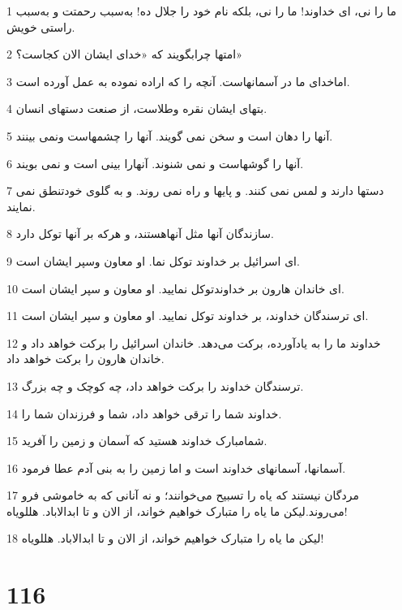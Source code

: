 \par 1 ما را نی، ای خداوند! ما را نی، بلکه نام خود را جلال ده! به‌سبب رحمتت و به‌سبب راستی خویش.
\par 2 امتها چرابگویند که «خدای ایشان الان کجاست؟»
\par 3 اماخدای ما در آسمانهاست. آنچه را که اراده نموده به عمل آورده است.
\par 4 بتهای ایشان نقره وطلاست، از صنعت دستهای انسان.
\par 5 آنها را دهان است و سخن نمی گویند. آنها را چشمهاست ونمی بینند.
\par 6 آنها را گوشهاست و نمی شنوند. آنهارا بینی است و نمی بویند.
\par 7 دستها دارند و لمس نمی کنند. و پایها و راه نمی روند. و به گلوی خودتنطق نمی نمایند.
\par 8 سازندگان آنها مثل آنهاهستند، و هر‌که بر آنها توکل دارد.
\par 9 ‌ای اسرائیل بر خداوند توکل نما. او معاون وسپر ایشان است.
\par 10 ‌ای خاندان هارون بر خداوندتوکل نمایید. او معاون و سپر ایشان است.
\par 11 ‌ای ترسندگان خداوند، بر خداوند توکل نمایید. او معاون و سپر ایشان است.
\par 12 خداوند ما را به یادآورده، برکت می‌دهد. خاندان اسرائیل را برکت خواهد داد و خاندان هارون را برکت خواهد داد.
\par 13 ترسندگان خداوند را برکت خواهد داد، چه کوچک و چه بزرگ.
\par 14 خداوند شما را ترقی خواهد داد، شما و فرزندان شما را.
\par 15 شمامبارک خداوند هستید که آسمان و زمین را آفرید.
\par 16 آسمانها، آسمانهای خداوند است و اما زمین را به بنی آدم عطا فرمود.
\par 17 مردگان نیستند که یاه را تسبیح می‌خوانند؛ و نه آنانی که به خاموشی فرو می‌روند.لیکن ما یاه را متبارک خواهیم خواند، از الان و تا ابدالاباد. هللویاه!
\par 18 لیکن ما یاه را متبارک خواهیم خواند، از الان و تا ابدالاباد. هللویاه!
 
\chapter{116}

